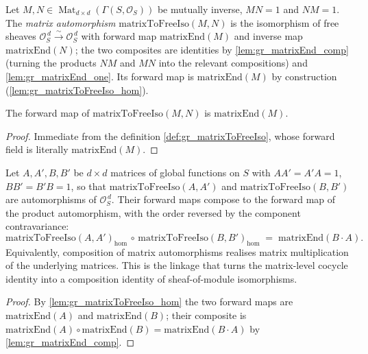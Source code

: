 \begin{definition}
  \label{def:gr_matrixToFreeIso}
  Let \(M, N \in \operatorname{Mat}_{d \times d}(\Gamma(S, \mathcal{O}_S))\) be mutually
  inverse, \(M N = 1\) and \(N M = 1\). The \emph{matrix automorphism}
  \(\mathrm{matrixToFreeIso}(M, N)\) is the isomorphism of free sheaves
  \(\mathcal{O}_S^{\,d} \xrightarrow{\sim} \mathcal{O}_S^{\,d}\) with forward map
  \(\mathrm{matrixEnd}(M)\) and inverse map \(\mathrm{matrixEnd}(N)\); the two
  composites are identities by \cref{lem:gr_matrixEnd_comp} (turning the products
  \(NM\) and \(MN\) into the relevant compositions) and \cref{lem:gr_matrixEnd_one}.
  Its forward map is \(\mathrm{matrixEnd}(M)\) by construction
  (\cref{lem:gr_matrixToFreeIso_hom}).
\end{definition}

\begin{lemma}
  \label{lem:gr_matrixToFreeIso_hom}
  The forward map of \(\mathrm{matrixToFreeIso}(M, N)\) is \(\mathrm{matrixEnd}(M)\).
\end{lemma}
\begin{proof}
  Immediate from the definition \cref{def:gr_matrixToFreeIso}, whose forward field is
  literally \(\mathrm{matrixEnd}(M)\).
\end{proof}

\begin{lemma}
  \label{lem:gr_matrixToFreeIso_mul}
  Let \(A, A', B, B'\) be \(d \times d\) matrices of global functions on \(S\) with
  \(A A' = A' A = 1\), \(B B' = B' B = 1\), so that \(\mathrm{matrixToFreeIso}(A, A')\)
  and \(\mathrm{matrixToFreeIso}(B, B')\) are automorphisms of \(\mathcal{O}_S^{\,d}\).
  Their forward maps compose to the forward map of the product automorphism, with the
  order reversed by the component contravariance:
  \[
    \mathrm{matrixToFreeIso}(A, A')_{\mathrm{hom}}
      \,\circ\, \mathrm{matrixToFreeIso}(B, B')_{\mathrm{hom}}
      \;=\; \mathrm{matrixEnd}(B \cdot A).
  \]
  Equivalently, composition of matrix automorphisms realises matrix multiplication of
  the underlying matrices. This is the linkage that turns the matrix-level cocycle
  identity into a composition identity of sheaf-of-module isomorphisms.
\end{lemma}
\begin{proof}
  By \cref{lem:gr_matrixToFreeIso_hom} the two forward maps are
  \(\mathrm{matrixEnd}(A)\) and \(\mathrm{matrixEnd}(B)\); their composite is
  \(\mathrm{matrixEnd}(A)\circ\mathrm{matrixEnd}(B) = \mathrm{matrixEnd}(B\cdot A)\) by
  \cref{lem:gr_matrixEnd_comp}.
\end{proof}

